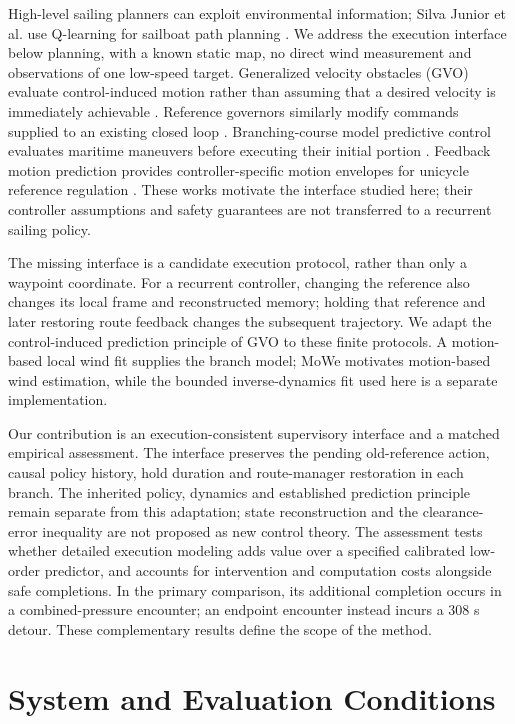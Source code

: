 \documentclass[conference]{IEEEtran}
\begin{document}
High-level sailing planners can exploit environmental information; Silva Junior et al. use Q-learning for sailboat path planning \cite{ref1}. We address the execution interface below planning, with a known static map, no direct wind measurement and observations of one low-speed target. Generalized velocity obstacles (GVO) evaluate control-induced motion rather than assuming that a desired velocity is immediately achievable \cite{ref2}. Reference governors similarly modify commands supplied to an existing closed loop \cite{ref3}. Branching-course model predictive control evaluates maritime maneuvers before executing their initial portion \cite{ref6}. Feedback motion prediction provides controller-specific motion envelopes for unicycle reference regulation \cite{ref7}. These works motivate the interface studied here; their controller assumptions and safety guarantees are not transferred to a recurrent sailing policy.

The missing interface is a candidate execution protocol, rather than only a waypoint coordinate. For a recurrent controller, changing the reference also changes its local frame and reconstructed memory; holding that reference and later restoring route feedback changes the subsequent trajectory. We adapt the control-induced prediction principle of GVO to these finite protocols. A motion-based local wind fit supplies the branch model; MoWe \cite{ref4} motivates motion-based wind estimation, while the bounded inverse-dynamics fit used here is a separate implementation.

Our contribution is an execution-consistent supervisory interface and a matched empirical assessment. The interface preserves the pending old-reference action, causal policy history, hold duration and route-manager restoration in each branch. The inherited policy, dynamics and established prediction principle remain separate from this adaptation; state reconstruction and the clearance-error inequality are not proposed as new control theory. The assessment tests whether detailed execution modeling adds value over a specified calibrated low-order predictor, and accounts for intervention and computation costs alongside safe completions. In the primary comparison, its additional completion occurs in a combined-pressure encounter; an endpoint encounter instead incurs a 308 s detour. These complementary results define the scope of the method.

\section{System and Evaluation Conditions}
\end{document}
